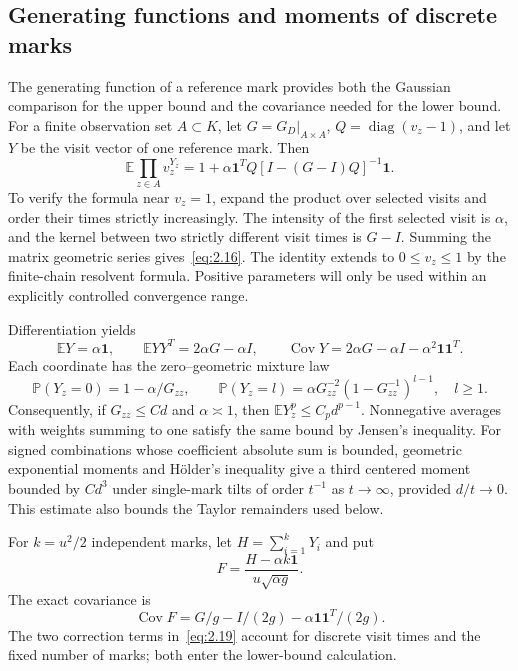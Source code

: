 \documentclass[11pt,letterpaper,reqno]{amsart}
\numberwithin{equation}{section}
\theoremstyle{remark}
\begin{document}
\subsection{Generating functions and moments of discrete marks}\label{sec:markformulas}
The generating function of a reference mark provides both the Gaussian comparison for the upper bound and the covariance needed for the lower bound. For a finite observation set $A\subset K$, let $G=G_D|_{A\times A}$, $Q=\operatorname{diag}(v_z-1)$, and let $Y$ be the visit vector of one reference mark. Then
\begin{equation}\label{eq:2.16}
\mathbb E\prod_{z\in A}v_z^{Y_z}
=1+\alpha\mathbf1^TQ[I-(G-I)Q]^{-1}\mathbf1.
\end{equation}
To verify the formula near $v_z=1$, expand the product over selected visits and order their times strictly increasingly. The intensity of the first selected visit is $\alpha$, and the kernel between two strictly different visit times is $G-I$. Summing the matrix geometric series gives~\eqref{eq:2.16}. The identity extends to $0\le v_z\le1$ by the finite-chain resolvent formula. Positive parameters will only be used within an explicitly controlled convergence range.

Differentiation yields
\begin{equation}\label{eq:2.17}
\mathbb EY=\alpha\mathbf1,\qquad
\mathbb EYY^T=2\alpha G-\alpha I,\qquad
\operatorname{Cov}Y=2\alpha G-\alpha I-\alpha^2\mathbf1\mathbf1^T.
\end{equation}
Each coordinate has the zero--geometric mixture law
\begin{equation}\label{eq:2.18}
\mathbb P(Y_z=0)=1-\alpha/G_{zz},\qquad
\mathbb P(Y_z=l)=\alpha G_{zz}^{-2}(1-G_{zz}^{-1})^{l-1},\quad l\ge1.
\end{equation}
Consequently, if $G_{zz}\le Cd$ and $\alpha\asymp1$, then $\mathbb E Y_z^p\le C_pd^{p-1}$. Nonnegative averages with weights summing to one satisfy the same bound by Jensen's inequality. For signed combinations whose coefficient absolute sum is bounded, geometric exponential moments and H\"older's inequality give a third centered moment bounded by $Cd^3$ under single-mark tilts of order $t^{-1}$ as $t\to\infty$, provided $d/t\to0$. This estimate also bounds the Taylor remainders used below.

For $k=u^2/2$ independent marks, let $H=\sum_{i=1}^kY_i$ and put
\[
F=\frac{H-\alpha k\mathbf1}{u\sqrt{\alpha g}}.
\]
The exact covariance is
\begin{equation}\label{eq:2.19}
\operatorname{Cov}F=G/g-I/(2g)-\alpha\mathbf1\mathbf1^T/(2g).
\end{equation}
The two correction terms in~\eqref{eq:2.19} account for discrete visit times and the fixed number of marks; both enter the lower-bound calculation.
\end{document}
